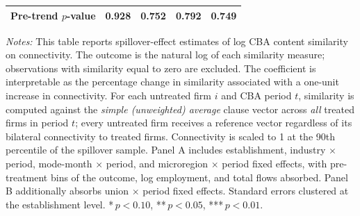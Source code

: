 \begin{table}[H]
\begin{tabular}{lcccc}
Pre-trend $p$-value & 0.928 & 0.752 & 0.792 & 0.749 \\
\hline\hline
\end{tabular}
\begin{minipage}{\linewidth}
\smallskip
\scriptsize\textit{Notes:} This table reports spillover-effect estimates of log CBA content similarity on connectivity. The outcome is the natural log of each similarity measure; observations with similarity equal to zero are excluded. The coefficient is interpretable as the percentage change in similarity associated with a one-unit increase in connectivity. For each untreated firm $i$ and CBA period $t$, similarity is computed against the \emph{simple (unweighted) average} clause vector across \emph{all} treated firms in period $t$; every untreated firm receives a reference vector regardless of its bilateral connectivity to treated firms. Connectivity is scaled to 1 at the 90th percentile of the spillover sample. Panel A includes establishment, industry $\times$ period, mode-month $\times$ period, and microregion $\times$ period fixed effects, with pre-treatment bins of the outcome, log employment, and total flows absorbed. Panel B additionally absorbs union $\times$ period fixed effects. Standard errors clustered at the establishment level. *\,$p<0.10$, **\,$p<0.05$, ***\,$p<0.01$.
\end{minipage}
\end{table}
